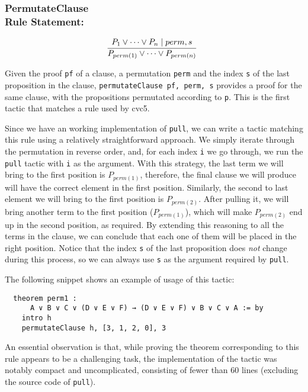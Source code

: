 \subsubsection*{PermutateClause\\Rule Statement:}
\[
  \infer[]{P_{perm(1)} \vee \cdots \vee P_{perm(n)}}{P_{1} \vee \cdots \vee P_{n} \mid perm, s}
\]

Given the proof \texttt{pf} of a clause, a permutation \texttt{perm} and the index \texttt{s} of the last
proposition in the clause, \texttt{permutateClause pf, perm, s} provides a proof for the same clause, with
the propositions permutated according to \texttt{p}. This is the first tactic that matches a rule used by
cvc5.

Since we have an working implementation of \texttt{pull}, we can write a tactic matching
this rule using a relatively straightforward approach. We simply iterate through the permutation in
reverse order, and, for each index \texttt{i} we go through, we run the \texttt{pull} tactic
with \texttt{i} as the argument. With this strategy, the last term we will bring to the first position is
$P_{perm(1)}$, therefore, the final clause we will produce will have the correct element in the first position.
Similarly, the second to last element we will bring to the first
position is $P_{perm(2)}$. After pulling it, we will bring another term to the first position ($P_{perm(1)}$), which will make $P_{perm(2)}$
end up in the second position, as required. By extending this reasoning to all the terms in the clause,
we can conclude that each one of them will be placed in the right position. Notice that the index \texttt{s} of
the last proposition does \textit{not} change during this process, so we can always use \texttt{s} as the argument
required by \texttt{pull}.


The following snippet shows an example of usage of this tactic:

\begin{verbatim}
  theorem perm1 :
      A ∨ B ∨ C ∨ (D ∨ E ∨ F) → (D ∨ E ∨ F) ∨ B ∨ C ∨ A := by
    intro h
    permutateClause h, [3, 1, 2, 0], 3
\end{verbatim}

An essential observation is that, while proving the theorem corresponding to this rule appears to be a
challenging task, the implementation of the tactic was notably compact and uncomplicated, consisting of fewer
than 60 lines (excluding the source code of \texttt{pull}).


